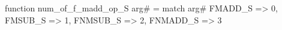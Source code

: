 function num_of_f_madd_op_S arg# = match arg# {
  FMADD_S => 0,
  FMSUB_S => 1,
  FNMSUB_S => 2,
  FNMADD_S => 3
}
